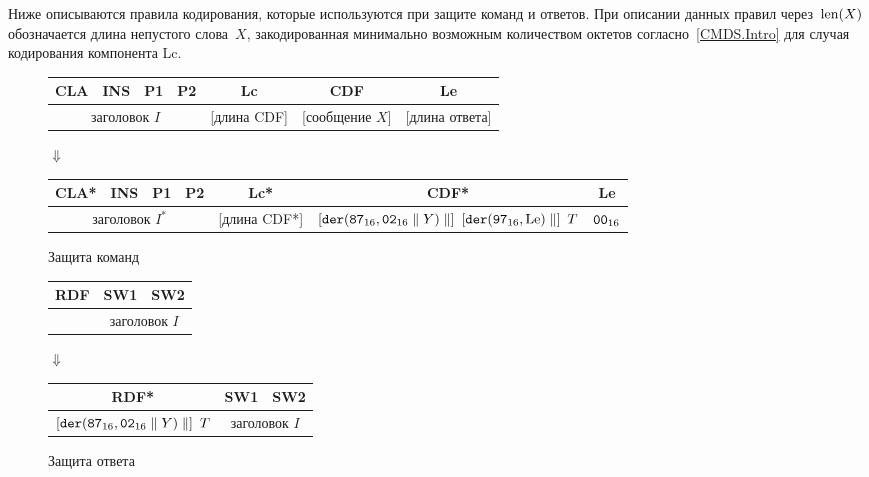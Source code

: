 Ниже описываются правила кодирования, которые используются при защите 
команд и ответов. При описании данных правил через~$\text{len}(X)$ обозначается 
длина непустого слова~$X$, закодированная минимально возможным количеством 
октетов согласно~\ref{CMDS.Intro} для случая кодирования компонента Lc. 


\begin{figure}[!h]
\begin{center}
\begin{tabular}{|c|c|c|c|c|c|c|}
\hline
CLA & INS & P1 & P2 & Lc & CDF & Le \\
\hline
\hline
\multicolumn{4}{|c|}{заголовок $I$} & [длина CDF] & [сообщение $X$] & [длина ответа]\\
\hline
\end{tabular}

\vskip3pt$\Downarrow$\vskip3pt

\begin{tabular}{|c|c|c|c|c|c|c|}
\hline
CLA* & INS & P1 & P2 & Lc* & CDF* & Le \\
\hline
\hline
\multicolumn{4}{|c|}{заголовок $I^*$} & [длина CDF*] & 
$\left[\der(\hex{87},\hex{02}\parallel Y)\parallel\right]\ 
\left[\der(\hex{97},\text{Le})\parallel\right]\ T$ & $\texttt{00}_{16}$\\
\hline
\end{tabular}
\end{center}
\caption{Защита команд}\label{Fig.CMDS.Cmd}
\end{figure}

\begin{figure}[!h]
\begin{center}
\begin{tabular}{|c|c|c|}
\hline
RDF & SW1 & SW2 \\
\hline
\hline
[сообщение $X$] & \multicolumn{2}{|c|}{заголовок $I$} \\
\hline
\end{tabular}

$\Downarrow$

\begin{tabular}{|c|c|c|}
\hline
RDF* & SW1 & SW2 \\
\hline
\hline
$\left[\texttt{der}(\texttt{87}_{16},\texttt{02}_{16}\parallel Y)\parallel\right]\ T$ & 
\multicolumn{2}{|c|}{заголовок $I$} \\
\hline
\end{tabular}
\end{center}
\caption{Защита ответа}\label{Fig.CMDS.Answer}
\end{figure}

